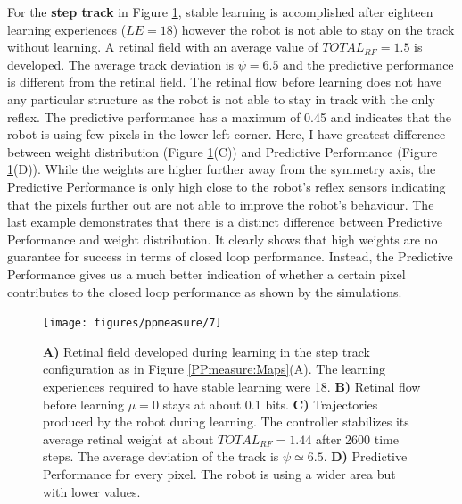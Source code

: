 For the \textbf{step track} in Figure \ref{PPmeasure:step}, stable learning
is accomplished after eighteen learning experiences ($LE=18$) however the robot
is not able to stay on the track without learning.
A retinal field with an average value of $TOTAL_{RF}=1.5$ is developed.
The average track deviation is $\psi=6.5$ and the predictive performance is different
from the retinal field. The retinal flow before learning does not have any particular structure as the robot is not able to stay in track
with the only reflex. The predictive performance has a maximum of 0.45 and indicates that the robot is using few pixels in the lower 
left corner.
Here, I have greatest difference between weight
distribution (Figure \ref{PPmeasure:step}(C)) and Predictive Performance (Figure \ref{PPmeasure:step}(D)).
While the weights are higher further away from the symmetry axis, the Predictive Performance is
only high close to the robot’s reﬂex sensors indicating that the pixels further out
are not able to improve the robot’s behaviour.
The last example demonstrates that there is a distinct difference between Predictive
Performance and weight distribution. It clearly shows that high weights
are no guarantee for success in terms of closed loop performance. Instead, the
Predictive Performance gives us a much better indication of whether a certain
pixel contributes to the closed loop performance as shown by the simulations.

\begin{figure}[!hbt]
	\begin{center}
		\texttt{[image: figures/ppmeasure/7]}
	\end{center}
	\caption[Performance for the step track]{
	{\bf A)} Retinal field developed during learning in the step track configuration as in Figure \ref{PPmeasure:Maps}(A).
		      The learning experiences required to have stable learning were 18.
	{\bf B)} Retinal flow before learning $\mu=0$ stays at about 0.1 bits. 
	{\bf C)} Trajectories produced by the robot during learning. The controller stabilizes its average retinal weight at about $TOTAL_{RF}=1.44$ after 2600 time steps. The average deviation of the track is $\psi \simeq 6.5$.  
	{\bf D)} Predictive Performance for every pixel. The robot is using a wider area but with lower values. \label{PPmeasure:step}}
\end{figure}

